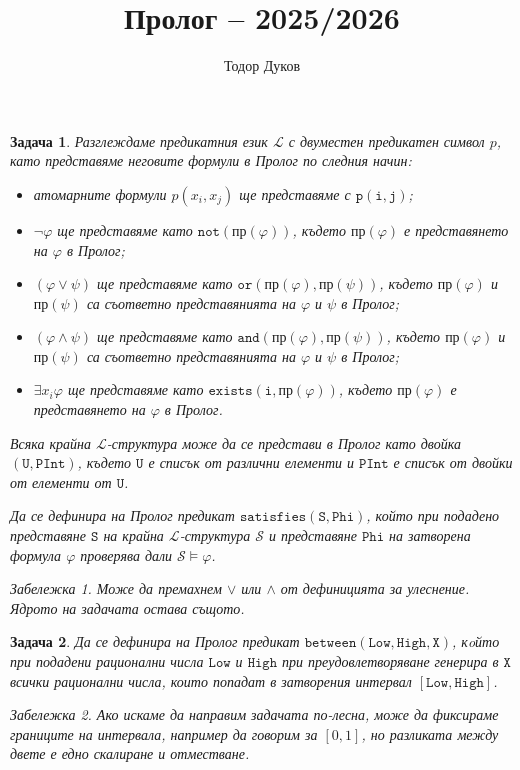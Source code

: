 \documentclass[12pt]{article}
\title{Пролог -- 2025/2026}
\author{Тодор Дуков}
\date{}
\newcommand{\calS}{\mathcal{S}}
\newcommand{\calL}{\mathcal{L}}
\newtheorem{problem}{Задача}
\theoremstyle{definition}
\theoremstyle{remark}
\newtheorem*{remark}{Забележка}
\begin{document}
\maketitle

\begin{problem}
  Разглеждаме предикатния език $\calL$ с двуместен предикатен символ $p$, като представяме неговите формули в Пролог по следния начин:
  \begin{itemize}
    \item атомарните формули $p(x_i, x_j)$ ще представяме с $\mathtt{p(i, j)}$;
    \item $\neg \varphi$ ще представяме като $\mathtt{not}(\text{пр}(\varphi))$, където $\text{пр}(\varphi)$ е представянето на $\varphi$ в Пролог;
    \item $(\varphi \lor \psi)$ ще представяме като $\mathtt{or}(\text{пр}(\varphi), \text{пр}(\psi))$, където $\text{пр}(\varphi)$ и $\text{пр}(\psi)$ са съответно представянията на $\varphi$ и $\psi$ в Пролог;
    \item $(\varphi \land \psi)$ ще представяме като $\mathtt{and}(\text{пр}(\varphi), \text{пр}(\psi))$, където $\text{пр}(\varphi)$ и $\text{пр}(\psi)$ са съответно представянията на $\varphi$ и $\psi$ в Пролог;
    \item $\exists x_i \varphi$ ще представяме като $\mathtt{exists}(\mathtt{i}, \text{пр}(\varphi))$, където $\text{пр}(\varphi)$ е представянето на $\varphi$ в Пролог.
  \end{itemize}
  Всяка крайна $\calL$-структура може да се представи в Пролог като двойка $\mathtt{(U, PInt)}$, където $\mathtt{U}$ е списък от различни елементи и $\mathtt{PInt}$ е списък от двойки от елементи от $\mathtt{U}$.

  Да се дефинира на Пролог предикат $\mathtt{satisfies(S, Phi)}$, който при подадено представяне $\mathtt{S}$ на крайна $\calL$-структура $\calS$ и представяне $\mathtt{Phi}$ на затворена формула $\varphi$ проверява дали $\calS \models \varphi$.
  \begin{remark}
    Може да премахнем $\lor$ или $\land$ от дефиницията за улеснение.
    Ядрото на задачата остава същото.
  \end{remark}
\end{problem}

\begin{problem}
  Да се дефинира на Пролог предикат $\mathtt{between(Low, High, X)}$, кoйто при подадени рационални числа $\mathtt{Low}$ и $\mathtt{High}$ при преудовлетворяване генерира в $\mathtt{X}$ всички рационални числа, които попадат в затворения интервал $[\mathtt{Low}, \mathtt{High}]$.
  \begin{remark}
    Ако искаме да направим задачата по-лесна, може да фиксираме границите на интервала, например да говорим за $[0, 1]$, но разликата между двете е едно скалиране и отместване.
  \end{remark}
\end{problem}
\end{document}
